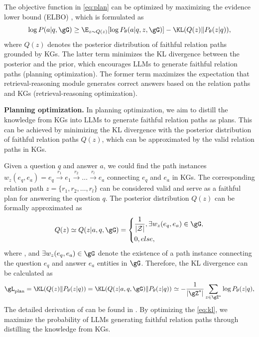 The objective function in \eqref{eq:plan} can be optimized by maximizing the evidence lower bound (ELBO) \citep{jordan1999introduction}, which is formulated as
\begin{equation}
    \log P(a|q,\gG) \geq \E_{z\sim Q(z)}[\log P_\theta(a|q,z,\gG)] - \KL(Q(z)\Vert P_\theta(z|q)),
\end{equation}
where $Q(z)$ denotes the posterior distribution of faithful relation paths grounded by KGs. The latter term minimizes the KL divergence between the posterior and the prior, which encourages LLMs to generate faithful relation paths (planning optimization). The former term maximizes the expectation that retrieval-reasoning module generates correct answers based on the relation paths and KGs (retrieval-reasoning optimization). 

\noindent\textbf{Planning optimization.} In planning optimization, we aim to distill the knowledge from KGs into LLMs to generate faithful relation paths as plans. This can be achieved by minimizing the KL divergence with the posterior distribution of faithful relation paths $Q(z)$, which can be approximated by the valid relation paths in KGs. 

Given a question $q$ and answer $a$, we could find the path instances $w_z(e_q,e_a)=e_q\xrightarrow{r_1}e_1\xrightarrow{r_2}\ldots\xrightarrow{r_l}e_{a}$ connecting $e_q$ and $e_a$ in KGs. The corresponding relation path $z=\{r_1,r_2,\dots,r_l\}$ can be considered valid and serve as a faithful plan for answering the question $q$. The posterior distribution $Q(z)$ can be formally approximated as
\begin{equation}
    \setlength\abovedisplayskip{1pt}%
    \setlength\belowdisplayskip{1pt}
    \label{eq:posterior}
    Q(z) \simeq Q(z|a, q, \gG)=
    \left\{
    \begin{aligned}
         & \RE{\frac{1}{|\mathcal{Z}|}}, \exists w_z(e_q,e_a) \in \gG, \\
         & 0, else,
    \end{aligned}
    \right.
\end{equation}
where , and $\exists w_z(e_q,e_a) \in \gG$ denote the existence of a path instance connecting the question $e_q$ and answer $e_a$ entities in $\gG$.
%
Therefore, the KL divergence can be calculated as
\begin{equation}
    \setlength\abovedisplayskip{1pt}%
    \setlength\belowdisplayskip{1pt}
    \label{eq:kl}
    \gL_{\text{plan}}=\KL(Q(z)\Vert P_\theta(z|q)) = \KL(Q(z|a, q, \gG)\Vert P_\theta(z|q)) \RE{~\simeq - \frac{1}{|\gZ^*|}\sum_{z\in\gZ^*} \log P_\theta(z|q),}
\end{equation}
 The detailed derivation of can be found in .
By optimizing the \eqref{eq:kl}, we maximize the probability of LLMs generating faithful relation paths through distilling the knowledge from KGs.

